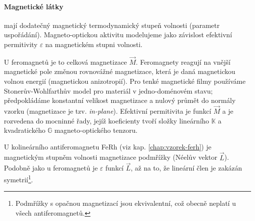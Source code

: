 \paragraph{Magnetické látky} mají dodatečný magnetický termodynamický stupeň volnosti (parametr uspořádání).
Magneto-optickou aktivitu modelujeme jako závislost efektivní permitivity $\varepsilon$ na magnetickém stupni volnosti.

U feromagnetů je to celková magnetizace $\vec{M}$. 
Feromagnety reagují na vnější magnetické pole změnou rovnovážné magnetizace, která je daná magnetickou volnou energií (magnetickou anizotropií).
Pro tenké magnetické filmy používáme Stonerův-Wohlfarthův model\cite{stonerMechanismMagneticHysteresis1991} pro materiál v jedno-doménovém stavu; předpokládáme konstantní velikost magnetizace a nulový průmět do normály vzorku (magnetizace je tzv. \emph{in-plane}).
Efektivní permitivita je funkcí $\vec{M}$ a je rozvedena do mocninné řady, jejíž koeficienty tvoří složky lineárního $\mathbb{K}$ a kvadratického $\mathbb{G}$ magneto-optického tenzoru\cite{visnovskyOpticsMagneticMultilayers2018}.

U kolineárního antiferomagnetu FeRh (viz kap. \ref{chap:vzorek-ferh}) je magnetickým stupněm volnosti magnetizace podmřížky (Néelův vektor $\vec{L}$)\cite{saidlUltrarychlaLaserovaSpektroskopie2018}.
Podobně jako u feromagnetů je $\varepsilon$ funkcí $\vec{L}$, až na to, že lineární člen je zakázán symetrií\footnote{Podmřížky s opačnou magnetizací jsou ekvivalentní, což obecně neplatí u všech antiferomagnetů.}.
